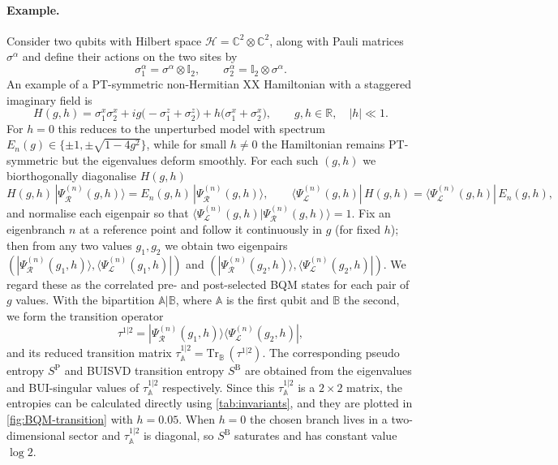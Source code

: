 \documentclass[11pt,a4paper]{article}
\begin{document}
\paragraph{Example.}
Consider two qubits with Hilbert space \(\mathcal H = \mathbb C^2\otimes \mathbb C^2\), along with Pauli matrices $\sigma^\alpha$ and define their actions on the two sites by
\begin{equation}
\sigma^\alpha_1 = \sigma^\alpha\otimes \mathbb I_2,\qquad
\sigma^\alpha_2 = \mathbb I_2\otimes\sigma^\alpha.
\end{equation}
An example of a PT-symmetric non-Hermitian XX Hamiltonian with a staggered imaginary field \cite{Korff_2008,Suzuki:2016xx} is
\begin{equation}
H(g,h)
= \sigma^x_1\sigma^x_2
+ i g \bigl(-\sigma^z_1+\sigma^z_2\bigr)
+ h\bigl(\sigma^x_1+\sigma^x_2\bigr),
\qquad g,h\in\mathbb R,\quad |h|\ll1 .
\end{equation}
For $h=0$ this reduces to the unperturbed model with spectrum $E_n(g)\in\{\pm1,\pm\sqrt{1-4g^2}\}$, while for small $h\neq0$ the Hamiltonian remains PT-symmetric but the eigenvalues deform smoothly. For each such $(g,h)$ we biorthogonally diagonalise $H(g,h)$
\begin{equation}
H(g,h)\,|\Psi^{(n)}_{\mathcal{R}}(g,h)\rangle
= E_n(g,h)\,|\Psi^{(n)}_{\mathcal{R}}(g,h)\rangle,
\qquad
\langle\Psi^{(n)}_{\mathcal{L}}(g,h)|\,H(g,h)
= \langle\Psi^{(n)}_{\mathcal{L}}(g,h)|\,E_n(g,h),
\end{equation}
and normalise each eigenpair so that $\langle\Psi^{(n)}_{\mathcal{L}}(g,h)|\Psi^{(n)}_{\mathcal{R}}(g,h)\rangle=1$. Fix an eigenbranch $n$ at a reference point and follow it continuously in $g$ (for fixed $h$); then from any two values $g_1,g_2$ we obtain two eigenpairs $(|\Psi^{(n)}_{\mathcal{R}}(g_1,h)\rangle,\langle\Psi^{(n)}_{\mathcal{L}}(g_1,h)|)$ and $(|\Psi^{(n)}_{\mathcal{R}}(g_2,h)\rangle,\langle\Psi^{(n)}_{\mathcal{L}}(g_2,h)|)$. We regard these as the correlated pre- and post-selected BQM states for each pair of $g$ values. With the bipartition $\mathbb A|\mathbb B$, where $\mathbb A$ is the first qubit and $\mathbb B$ the second, we form the transition operator
\begin{equation}
\tau^{1|2}=|\Psi^{(n)}_{\mathcal{R}}(g_1,h)\rangle\langle\Psi^{(n)}_{\mathcal{L}}(g_2,h)|,
\end{equation}
and its reduced transition matrix $\tau^{1|2}_\mathbb A=\mathrm{Tr}_\mathbb B\, (\tau^{1|2})$. The corresponding pseudo entropy $S^{\mathrm P}$ and BUISVD transition entropy $ S^{\mathrm B}$ are obtained from the eigenvalues and BUI-singular values of $\tau^{1|2}_\mathbb A$ respectively. Since this $\tau^{1|2}_\mathbb A$ is a $2\times2$ matrix, the entropies can be calculated directly using \cref{tab:invariants}, and they are plotted in \cref{fig:BQM-transition} with $h=0.05$. When $h=0$ the chosen branch lives in a two-dimensional sector and $\tau^{1|2}_\mathbb A$ is diagonal, so $S^{\mathrm B}$ saturates and has constant value $\log 2$.
\end{document}

